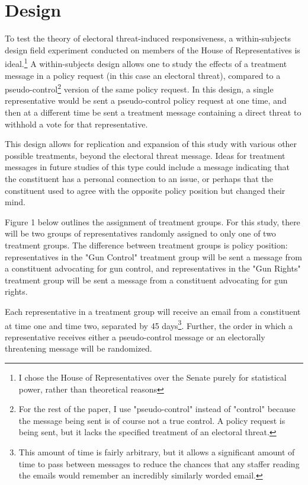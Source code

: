 \documentclass[12pt]{article}\usepackage[]{graphicx}\usepackage[]{color}
\begin{document}
\section{Design}
To test the theory of electoral threat-induced responsiveness, a within-subjects design field experiment conducted on members of the House of Representatives is ideal.\footnote{I chose the House of Representatives over the Senate purely for statistical power, rather than theoretical reasons} A within-subjects design allows one to study the effects of a treatment message in a policy request (in this case an electoral threat), compared to a pseudo-control\footnote{For the rest of the paper, I use "pseudo-control" instead of "control" because the message being sent is of course not a true control. A policy request is being sent, but it lacks the specified treatment of an electoral threat.} version of the same policy request. In this design, a single representative would be sent a pseudo-control policy request at one time, and then at a different time be sent a treatment message containing a direct threat to withhold a vote for that representative.

This design allows for replication and expansion of this study with various other possible treatments, beyond the electoral threat message. Ideas for treatment messages in future studies of this type could include a message indicating that the constituent has a personal connection to an issue, or perhaps that the constituent used to agree with the opposite policy position but changed their mind.

Figure 1 below outlines the assignment of treatment groups. For this study, there will be two groups of representatives randomly assigned to only one of two treatment groups. The difference between treatment groups is policy position: representatives in the "Gun Control" treatment group will be sent a message from a constituent advocating for gun control, and representatives in the "Gun Rights" treatment group will be sent a message from a constituent advocating for gun rights.

Each representative in a treatment group will receive an email from a constituent at time one and time two, separated by 45 days\footnote{This amount of time is fairly arbitrary, but it allows a significant amount of time to pass between messages to reduce the chances that any staffer reading the emails would remember an incredibly similarly worded email.}. Further, the order in which a representative receives either a pseudo-control message or an electorally threatening message will be randomized.
\end{document}
